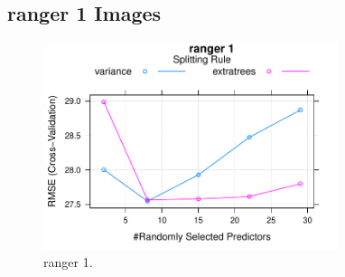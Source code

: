 
\subsection{ranger 1 Images} 
 

\begin{figure} 
\centering  
\includegraphics[width=0.77\textwidth]{Code_Outputs/ML_report_task_1ranger_RMSEvNVariables.pdf} 
\caption{\label{fig:ML_report_task_1rangerRMSEvNVariables}ranger 1.} 
\end{figure} 
 
